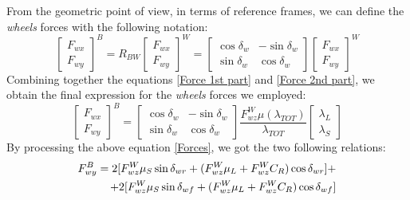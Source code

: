 \documentclass[a4paper,12pt,titlepage]{report}
\begin{document}
		From the geometric point of view, in terms of reference frames, we can define the \textit{wheels} forces with the following notation:
			\begin{equation} \label{Force 2nd part}
				\begin{bmatrix}
					F_{wx} \\
					F_{wy}
				\end{bmatrix}^{B} =	
				R_{BW}
				\begin{bmatrix}
					F_{wx} \\
					F_{wy}
				\end{bmatrix}^{W} =
				\begin{bmatrix}
					\cos\delta_{w} & -\sin\delta_{w} \\
					\sin\delta_{w} & \cos\delta_{w}
				\end{bmatrix}
				\begin{bmatrix}
					F_{wx} \\
					F_{wy}
				\end{bmatrix}^{W}
			\end{equation}
		Combining together the equations \ref{Force 1st part} and \ref{Force 2nd part}, we obtain the final expression for the \textit{wheels} forces we employed:
			\begin{equation} \label{Forces}
				\begin{bmatrix}
					F_{wx} \\
					F_{wy}
				\end{bmatrix}^{B} =	
				\begin{bmatrix}
					\cos\delta_{w} & -\sin\delta_{w} \\
					\sin\delta_{w} & \cos\delta_{w}
				\end{bmatrix}
				\frac{F_{wz}^{W} \mu(\lambda_{TOT})}{\lambda_{TOT}}
				\begin{bmatrix}
					\lambda_{L} \\
					\lambda_{S}
				\end{bmatrix}
			\end{equation}
		By processing the above equation \ref{Forces}, we got the two following relations:
			\begin{equation} \label{F_{wy}}
			\begin{split}
				F_{wy}^{B} = 2 [F_{wz}^{W} \mu_{S}\sin\delta_{wr} + (F_{wz}^{W} \mu_{L} + F_{wz}^{W} C_{R}) \cos\delta_{wr}] + \\ + 2 [F_{wz}^{W} \mu_{S}\sin\delta_{wf} + (F_{wz}^{W} \mu_{L} + F_{wz}^{W} C_{R})\cos\delta_{wf}] 
			\end{split}
			\end{equation}
\end{document}

